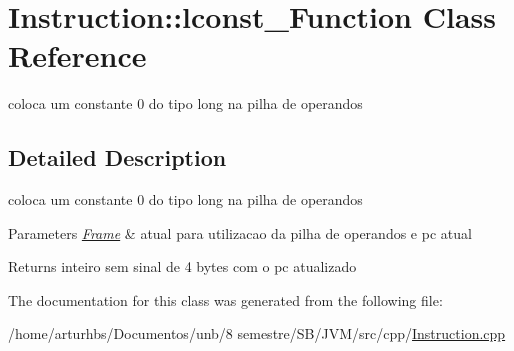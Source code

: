\hypertarget{classInstruction_1_1lconst__0Function}{}\section{Instruction\+:\+:lconst\+\_\+Function Class Reference}
\label{classInstruction_1_1lconst__0Function}


coloca um constante 0 do tipo long na pilha de operandos  




\subsection{Detailed Description}
coloca um constante 0 do tipo long na pilha de operandos 


\begin{DoxyParams}{Parameters}
{\em \hyperlink{classFrame}{Frame}} & atual para utilizacao da pilha de operandos e pc atual \\
\hline
\end{DoxyParams}
\begin{DoxyReturn}{Returns}
inteiro sem sinal de 4 bytes com o pc atualizado 
\end{DoxyReturn}


The documentation for this class was generated from the following file\+:\begin{DoxyCompactItemize}
\item 
/home/arturhbs/\+Documentos/unb/8 semestre/\+S\+B/\+J\+V\+M/src/cpp/\hyperlink{Instruction_8cpp}{Instruction.\+cpp}\end{DoxyCompactItemize}
